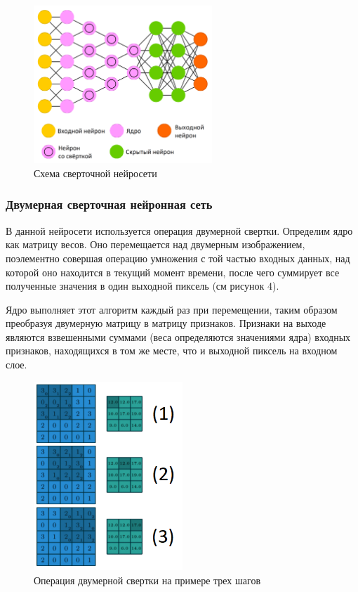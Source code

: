 \documentclass[bachelor, och, coursework]{SCWorks}
\begin{document}
        \begin{figure}[H]
            \centering
            \includegraphics[width=0.6\textwidth]{pic/cnn.png}
            \caption{Схема сверточной нейросети}
            \label{fig:img4}
        \end{figure}

        \subsubsection{Двумерная сверточная нейронная сеть}
            
            В данной нейросети используется операция двумерной свертки. Определим ядро как матрицу весов. Оно перемещается над двумерным изображением, поэлементно совершая операцию умножения с той частью входных данных, над которой оно находится в текущий момент времени, после чего суммирует все полученные значения в один выходной пиксель (см рисунок 4).

            Ядро выполняет этот алгоритм каждый раз при перемещении, таким образом преобразуя двумерную матрицу в матрицу признаков. Признаки на выходе являются взвешенными суммами (веса определяются значениями ядра) входных признаков, находящихся в том же месте, что и выходной пиксель на входном слое.

            \begin{figure}[H]
                \centering
                \includegraphics[width=0.5\textwidth]{pic/svertka.png}
                \caption{Операция двумерной свертки на примере трех шагов}
                \label{fig:img8}
            \end{figure}
\end{document}
